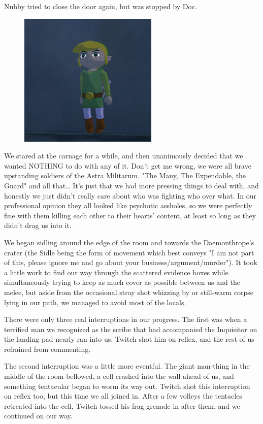 Nubby tried to close the door again, but was stopped by Doc.

\begin{figure}
	\begin{center}
		\includegraphics[width=\figwidth]{pics/16/24.png}
	\end{center}
\end{figure}
We stared at the carnage for a while, and then unanimously decided that we wanted NOTHING to do with any of it. 
Don't get me wrong, we were all brave upstanding soldiers of the Astra Militarum. 
"The Many, The Expendable, the Guard" and all that… It's just that we had more pressing things to deal with, and honestly we just didn't really care about who was fighting who over what. 
In our professional opinion they all looked like psychotic assholes, so we were perfectly fine with them killing each other to their hearts' content, at least so long as they didn't drag us into it.

We began sidling around the edge of the room and towards the Daemonthrope's crater (the Sidle being the form of movement which best conveys "I am not part of this, please ignore me and go about your business/argument/murder"). 
It took a little work to find our way through the scattered evidence boxes while simultaneously trying to keep as much cover as possible between us and the melee, but aside from the occasional stray shot whizzing by or still-warm corpse lying in our path, we managed to avoid most of the locals.

There were only three real interruptions in our progress. 
The first was when a terrified man we recognized as the scribe that had accompanied the Inquisitor on the landing pad nearly ran into us. 
Twitch shot him on reflex, and the rest of us refrained from commenting.

The second interruption was a little more eventful. 
The giant man-thing in the middle of the room bellowed, a cell crashed into the wall ahead of us, and something tentacular began to worm its way out. 
Twitch shot this interruption on reflex too, but this time we all joined in. 
After a few volleys the tentacles retreated into the cell, Twitch tossed his frag grenade in after them, and we continued on our way.

